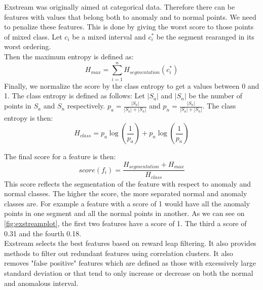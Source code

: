\documentclass[oneside, a4paper, onecolumn, 11pt]{article}
\begin{document}
Exstream was originally aimed at categorical data. Therefore there can be features with values that belong both to anomaly and to normal points. We need to penalize these features. This is done by giving the worst score to those points of mixed class. Let $c_i$ be a mixed interval and $c_i^*$ be the segment rearanged in its worst ordering.\\
Then the maximum entropy is defined as:
\begin{equation}
    H_{max} = \sum_{i=1}^{n} H_{segmentation}(c_i^*)
\end{equation}
Finally, we normalize the score by the class entropy to get a values between 0 and 1. The class entropy is defined as follows:
Let $|S_a|$ and $|S_n|$ be the number of points in $S_a$ and $S_n$ respectively. $p_a = \frac{|S_a|}{|S_a| + |S_n|}$ and $p_n = \frac{|S_n|}{|S_a| + |S_n|}$. The class entropy is then:
\begin{equation}
    H_{class} = p_a \log(\frac{1}{p_a}) + p_n \log(\frac{1}{p_n})
\end{equation}

The final score for a feature is then:
\begin{equation}
    score(f_i) = \frac{H_{segmentation} + H_{max}}{H_{class}}
\end{equation}
This score reflects the segmentation of the feature with respect to anomaly and normal classes. The higher the score, the more separated normal and anomaly classes are. For example a feature with a score of 1 would have all the anomaly points in one segment and all the normal points in another. As we can see on \autoref{fig:exstreamplot}, the first two features have a score of 1. The third a score of 0.31 and the fourth 0.18.\\
Exstream selects the best features based on reward leap filtering. It also provides methods to filter out redundant features using correlation clusters. It also removes "false positive" features which are defined as those with excessively large standard deviation or that tend to only increase or decrease on both the normal and anomalous interval.\\
\end{document}
